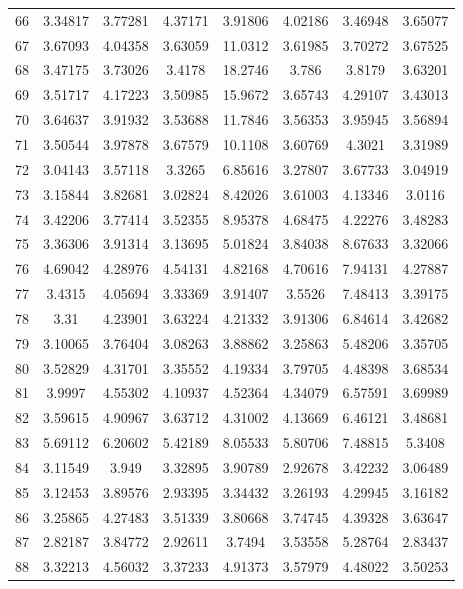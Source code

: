 \begin{center}
\begin{longtable}{cccccccc}
66 & 3.34817 & 3.77281 & 4.37171 & 3.91806 & 4.02186 & 3.46948 & 3.65077\\
67 & 3.67093 & 4.04358 & 3.63059 & 11.0312 & 3.61985 & 3.70272 & 3.67525\\
68 & 3.47175 & 3.73026 & 3.4178 & 18.2746 & 3.786 & 3.8179 & 3.63201\\
69 & 3.51717 & 4.17223 & 3.50985 & 15.9672 & 3.65743 & 4.29107 & 3.43013\\
70 & 3.64637 & 3.91932 & 3.53688 & 11.7846 & 3.56353 & 3.95945 & 3.56894\\
71 & 3.50544 & 3.97878 & 3.67579 & 10.1108 & 3.60769 & 4.3021 & 3.31989\\
72 & 3.04143 & 3.57118 & 3.3265 & 6.85616 & 3.27807 & 3.67733 & 3.04919\\
73 & 3.15844 & 3.82681 & 3.02824 & 8.42026 & 3.61003 & 4.13346 & 3.0116\\
74 & 3.42206 & 3.77414 & 3.52355 & 8.95378 & 4.68475 & 4.22276 & 3.48283\\
75 & 3.36306 & 3.91314 & 3.13695 & 5.01824 & 3.84038 & 8.67633 & 3.32066\\
76 & 4.69042 & 4.28976 & 4.54131 & 4.82168 & 4.70616 & 7.94131 & 4.27887\\
77 & 3.4315 & 4.05694 & 3.33369 & 3.91407 & 3.5526 & 7.48413 & 3.39175\\
78 & 3.31 & 4.23901 & 3.63224 & 4.21332 & 3.91306 & 6.84614 & 3.42682\\
79 & 3.10065 & 3.76404 & 3.08263 & 3.88862 & 3.25863 & 5.48206 & 3.35705\\
80 & 3.52829 & 4.31701 & 3.35552 & 4.19334 & 3.79705 & 4.48398 & 3.68534\\
81 & 3.9997 & 4.55302 & 4.10937 & 4.52364 & 4.34079 & 6.57591 & 3.69989\\
82 & 3.59615 & 4.90967 & 3.63712 & 4.31002 & 4.13669 & 6.46121 & 3.48681\\
83 & 5.69112 & 6.20602 & 5.42189 & 8.05533 & 5.80706 & 7.48815 & 5.3408\\
84 & 3.11549 & 3.949 & 3.32895 & 3.90789 & 2.92678 & 3.42232 & 3.06489\\
85 & 3.12453 & 3.89576 & 2.93395 & 3.34432 & 3.26193 & 4.29945 & 3.16182\\
86 & 3.25865 & 4.27483 & 3.51339 & 3.80668 & 3.74745 & 4.39328 & 3.63647\\
87 & 2.82187 & 3.84772 & 2.92611 & 3.7494 & 3.53558 & 5.28764 & 2.83437\\
88 & 3.32213 & 4.56032 & 3.37233 & 4.91373 & 3.57979 & 4.48022 & 3.50253\\

\end{longtable}
\end{center}
